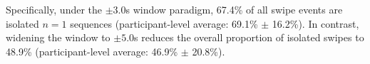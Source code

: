 Specifically, under the \(\pm3.0\)s window paradigm, 67.4\% of all swipe events are isolated \(n=1\) sequences (participant-level average: 69.1\% \(\pm\) 16.2\%). In contrast, widening the window to \(\pm5.0\)s reduces the overall proportion of isolated swipes to 48.9\% (participant-level average: 46.9\% \(\pm\) 20.8\%).
